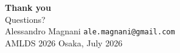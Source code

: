 \documentclass[10pt,aspectratio=169]{beamer}
\begin{document}
\begin{frame}[plain]
  \begin{center}
    \vspace{2em}
    {\Huge \bfseries Thank you}\\[1em]
    {\large Questions?}\\[2em]

    \small Alessandro Magnani \;\textbar\; \texttt{ale.magnani@gmail.com}\\
    AMLDS 2026 \;\textbar\; Osaka, July 2026
  \end{center}
\end{frame}
\end{document}
